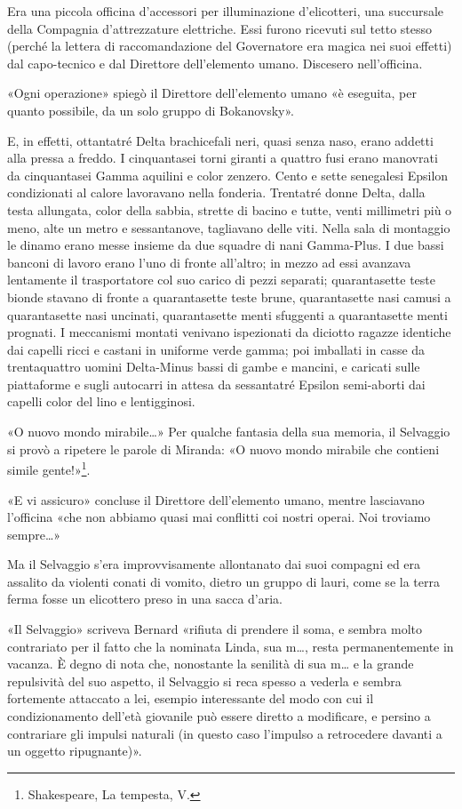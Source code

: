 \documentclass[
a5paper, %
10pt, %
twoside, 
onecolumn, %
openany, %
]{memoir}
\begin{document}
Era una piccola officina d’accessori per illuminazione d’elicotteri, una succursale della Compagnia d’attrezzature elettriche. Essi furono ricevuti sul tetto stesso (perché la lettera di raccomandazione del Governatore era magica nei suoi effetti) dal capo-tecnico e dal Direttore dell’elemento umano. Discesero nell’officina.

«Ogni operazione» spiegò il Direttore dell’elemento umano «è eseguita, per quanto possibile, da un solo gruppo di Bokanovsky».

E, in effetti, ottantatré Delta brachicefali neri, quasi senza naso, erano addetti alla pressa a freddo. I cinquantasei torni giranti a quattro fusi erano manovrati da cinquantasei Gamma aquilini e color zenzero. Cento e sette senegalesi Epsilon condizionati al calore lavoravano nella fonderia. Trentatré donne Delta, dalla testa allungata, color della sabbia, strette di bacino e tutte, venti millimetri più o meno, alte un metro e sessantanove, tagliavano delle viti. Nella sala di montaggio le dinamo erano messe insieme da due squadre di nani Gamma-Plus. I due bassi banconi di lavoro erano l’uno di fronte all’altro; in mezzo ad essi avanzava lentamente il trasportatore col suo carico di pezzi separati; quarantasette teste bionde stavano di fronte a quarantasette teste brune, quarantasette nasi camusi a quarantasette nasi uncinati, quarantasette menti sfuggenti a quarantasette menti prognati. I meccanismi montati venivano ispezionati da diciotto ragazze identiche dai capelli ricci e castani in uniforme verde gamma; poi imballati in casse da trentaquattro uomini Delta-Minus bassi di gambe e mancini, e caricati sulle piattaforme e sugli autocarri in attesa da sessantatré Epsilon semi-aborti dai capelli color del lino e lentigginosi.

«O nuovo mondo mirabile…» Per qualche fantasia della sua memoria, il Selvaggio si provò a ripetere le parole di Miranda: «O nuovo mondo mirabile che contieni simile gente!»\footnote{Shakespeare, La tempesta, V.}.

«E vi assicuro» concluse il Direttore dell’elemento umano, mentre lasciavano l’officina «che non abbiamo quasi mai conflitti coi nostri operai. Noi troviamo sempre…»

Ma il Selvaggio s’era improvvisamente allontanato dai suoi compagni ed era assalito da violenti conati di vomito, dietro un gruppo di lauri, come se la terra ferma fosse un elicottero preso in una sacca d’aria.

«Il Selvaggio» scriveva Bernard «rifiuta di prendere il soma, e sembra molto contrariato per il fatto che la nominata Linda, sua m…, resta permanentemente in vacanza. È degno di nota che, nonostante la senilità di sua m… e la grande repulsività del suo aspetto, il Selvaggio si reca spesso a vederla e sembra fortemente attaccato a lei, esempio interessante del modo con cui il condizionamento dell’età giovanile può essere diretto a modificare, e persino a contrariare gli impulsi naturali (in questo caso l’impulso a retrocedere davanti a un oggetto ripugnante)».
\end{document}
